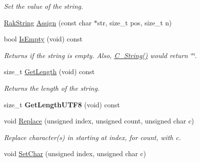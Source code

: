 \begin{DoxyCompactItemize}
\begin{DoxyCompactList}\small\item\em Set the value of the string. \end{DoxyCompactList}\item 
\hyperlink{class_rak_net_1_1_rak_string}{Rak\-String} \hyperlink{class_rak_net_1_1_rak_string_ae31938d97fee2505f2d353e78f566a1c}{Assign} (const char $\ast$str, size\-\_\-t pos, size\-\_\-t n)
\item 
\hypertarget{class_rak_net_1_1_rak_string_ae022e3749d4c3a40c81634ab1aea55ce}{bool \hyperlink{class_rak_net_1_1_rak_string_ae022e3749d4c3a40c81634ab1aea55ce}{Is\-Empty} (void) const }\label{class_rak_net_1_1_rak_string_ae022e3749d4c3a40c81634ab1aea55ce}

\begin{DoxyCompactList}\small\item\em Returns if the string is empty. Also, \hyperlink{class_rak_net_1_1_rak_string_ae8fe1422249ea883413a535d01d8ffea}{C\-\_\-\-String()} would return \char`\"{}\char`\"{}. \end{DoxyCompactList}\item 
\hypertarget{class_rak_net_1_1_rak_string_ac4923ba9b9ee2b8c62ae9477e52c51b3}{size\-\_\-t \hyperlink{class_rak_net_1_1_rak_string_ac4923ba9b9ee2b8c62ae9477e52c51b3}{Get\-Length} (void) const }\label{class_rak_net_1_1_rak_string_ac4923ba9b9ee2b8c62ae9477e52c51b3}

\begin{DoxyCompactList}\small\item\em Returns the length of the string. \end{DoxyCompactList}\item 
\hypertarget{class_rak_net_1_1_rak_string_a5a5f36f75dbf39e034d034823278e7f0}{size\-\_\-t {\bfseries Get\-Length\-U\-T\-F8} (void) const }\label{class_rak_net_1_1_rak_string_a5a5f36f75dbf39e034d034823278e7f0}

\item 
\hypertarget{class_rak_net_1_1_rak_string_a908d42cb232ad4ea0e24eafc10849bfa}{void \hyperlink{class_rak_net_1_1_rak_string_a908d42cb232ad4ea0e24eafc10849bfa}{Replace} (unsigned index, unsigned count, unsigned char c)}\label{class_rak_net_1_1_rak_string_a908d42cb232ad4ea0e24eafc10849bfa}

\begin{DoxyCompactList}\small\item\em Replace character(s) in starting at index, for count, with c. \end{DoxyCompactList}\item 
\hypertarget{class_rak_net_1_1_rak_string_a8eee79526c9a5127d690d604de575e75}{void \hyperlink{class_rak_net_1_1_rak_string_a8eee79526c9a5127d690d604de575e75}{Set\-Char} (unsigned index, unsigned char c)}\label{class_rak_net_1_1_rak_string_a8eee79526c9a5127d690d604de575e75}


\end{DoxyCompactItemize}
